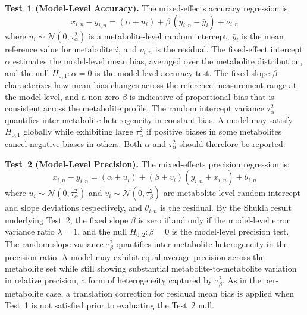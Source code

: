 \textbf{Test~1 (Model-Level Accuracy).} The mixed-effects accuracy regression is:
\begin{equation}\label{eqn:me_test1}
    x_{i,n} - y_{i,n} = (\alpha + u_i)
        + \beta\,(y_{i,n} - \bar{y}_i) + \nu_{i,n}
\end{equation}
\noindent where $u_i \sim \mathcal{N}(0, \tau^2_\alpha)$ is a metabolite-level random intercept, $\bar{y}_i$ is the mean reference value for metabolite $i$, and $\nu_{i,n}$ is the residual. The fixed-effect intercept $\alpha$ estimates the model-level mean bias, averaged over the metabolite distribution, and the null $H_{0,1}: \alpha = 0$ is the model-level accuracy test. The fixed slope $\beta$ characterizes how mean bias changes across the reference measurement range at the model level, and a non-zero $\beta$ is indicative of proportional bias that is consistent across the metabolite profile. The random intercept variance $\tau^2_\alpha$ quantifies inter-metabolite heterogeneity in constant bias. A model may satisfy $H_{0,1}$ globally while exhibiting large $\tau^2_\alpha$ if positive biases in some metabolites cancel negative biases in others. Both $\alpha$ and $\tau^2_\alpha$ should therefore be reported.

\textbf{Test~2 (Model-Level Precision).} The mixed-effects precision regression is:
\begin{equation}\label{eqn:me_test2}
    x_{i,n} - y_{i,n} = (\alpha + u_i)
        + (\beta + v_i)(y_{i,n} + x_{i,n}) + \theta_{i,n}
\end{equation}
\noindent where $u_i \sim \mathcal{N}(0, \tau^2_\alpha)$ and $v_i \sim \mathcal{N}(0, \tau^2_\beta)$ are metabolite-level random intercept and slope deviations respectively, and $\theta_{i,n}$ is the residual. By the Shukla result~\cite{Shukla1973} underlying Test~2, the fixed slope $\beta$ is zero if and only if the model-level error variance ratio $\lambda = 1$, and the null $H_{0,2}: \beta = 0$ is the model-level precision test. The random slope variance $\tau^2_\beta$ quantifies inter-metabolite heterogeneity in the precision ratio. A model may exhibit equal average precision across the metabolite set while still showing substantial metabolite-to-metabolite variation in relative precision, a form of heterogeneity captured by $\tau^2_\beta$. As in the per-metabolite case, a translation correction for residual mean bias is applied when Test~1 is not satisfied prior to evaluating the Test~2 null.


